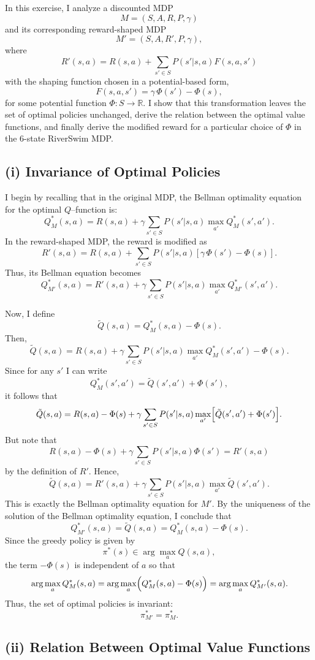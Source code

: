 In this exercise, I analyze a discounted MDP 
\[
M=(S,A,R,P,\gamma)
\]
and its corresponding reward-shaped MDP 
\[
M'=(S,A,R',P,\gamma),
\]
where 
\[
R'(s,a)=R(s,a)+\sum_{s'\in S}P(s'|s,a)F(s,a,s')
\]
with the shaping function chosen in a potential-based form,
\[
F(s,a,s')=\gamma\,\Phi(s')-\Phi(s),
\]
for some potential function \(\Phi:S\to \mathbb{R}\). I show that this transformation leaves the set of optimal policies unchanged, derive the relation between the optimal value functions, and finally derive the modified reward for a particular choice of \(\Phi\) in the 6-state RiverSwim MDP.

\subsection*{(i) Invariance of Optimal Policies}

I begin by recalling that in the original MDP, the Bellman optimality equation for the optimal $Q$--function is:
\[
Q^*_M(s,a)=R(s,a)+\gamma\sum_{s'\in S}P(s'|s,a)\max_{a'}Q^*_M(s',a').
\]
In the reward-shaped MDP, the reward is modified as
\[
R'(s,a)=R(s,a)+\sum_{s'\in S}P(s'|s,a)[\gamma\,\Phi(s')-\Phi(s)].
\]
Thus, its Bellman equation becomes
\[
Q^*_{M'}(s,a)=R'(s,a)+\gamma\sum_{s'\in S}P(s'|s,a)\max_{a'}Q^*_{M'}(s',a').
\]

Now, I define
\[
\tilde{Q}(s,a)=Q^*_M(s,a)-\Phi(s).
\]
Then,
\[
\tilde{Q}(s,a)=R(s,a)+\gamma\sum_{s'\in S}P(s'|s,a)\max_{a'}Q^*_M(s',a')-\Phi(s).
\]
Since for any \(s'\) I can write 
\[
Q^*_M(s',a')=\tilde{Q}(s',a')+\Phi(s'),
\]
it follows that
\[
\tilde{Q}(s,a)=R(s,a)-\Phi(s)+\gamma\sum_{s'\in S}P(s'|s,a)\max_{a'}\Bigl[\tilde{Q}(s',a')+\Phi(s')\Bigr].
\]
But note that
\[
R(s,a)-\Phi(s)+\gamma\sum_{s'\in S}P(s'|s,a)\Phi(s') = R'(s,a)
\]
by the definition of \(R'\). Hence,
\[
\tilde{Q}(s,a)=R'(s,a)+\gamma\sum_{s'\in S}P(s'|s,a)\max_{a'}\tilde{Q}(s',a').
\]
This is exactly the Bellman optimality equation for \(M'\). By the uniqueness of the solution of the Bellman optimality equation, I conclude that
\[
Q^*_{M'}(s,a)=\tilde{Q}(s,a)= Q^*_M(s,a)-\Phi(s).
\]
Since the greedy policy is given by 
\[
\pi^*(s) \in \arg\max_{a} Q(s,a),
\]
the term \(-\Phi(s)\) is independent of \(a\) so that
\[
\arg\max_{a}Q^*_M(s,a)=\arg\max_{a}\Bigl(Q^*_M(s,a)-\Phi(s)\Bigr)=\arg\max_{a} Q^*_{M'}(s,a).
\]
Thus, the set of optimal policies is invariant:
\[
\pi^*_{M'}=\pi^*_M.
\]

\subsection*{(ii) Relation Between Optimal Value Functions}


